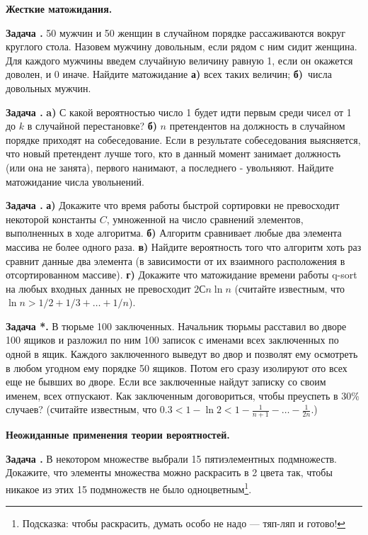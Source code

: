 \documentclass[11pt,a4paper]{article}
\newcounter{znum}
\newcommand{\z}[1]{\addtocounter{znum}{1} \textbf{Задача \arabic{znum}#1. }}
\renewcommand{\!}{\textcolor{red}{!}}
\begin{document}
\pagestyle{empty}

\newpage
\begin{center}
	\large
	\textbf{Жесткие матожидания.}
\end{center}

\z{} 50 мужчин и 50 женщин в случайном порядке рассаживаются вокруг круглого стола. Назовем мужчину довольным, если рядом с ним сидит женщина. Для каждого мужчины введем случайную величину равную 1, если он окажется доволен, и 0 иначе. Найдите матожидание \textbf{а)} всех таких величин; \textbf{б)}~числа довольных мужчин.

\z{} \textbf{a)} С какой вероятностью число 1 будет идти первым среди чисел от 1 до $k$ в случайной перестановке?
\textbf{б)} $n$ претендентов на должность в случайном порядке приходят на собеседование. Если в результате собеседования выясняется, что новый претендент лучше того, кто в данный момент занимает должность (или она не занята), первого нанимают, а последнего - увольняют. Найдите матожидание числа увольнений.

\z{} \textbf{а)} Докажите что время работы быстрой сортировки не превосходит некоторой константы $C$, умноженной на число сравнений элементов, выполненных в ходе алгоритма. \textbf{б)} Алгоритм сравнивает любые два элемента массива не более одного раза. \textbf{в)}  Найдите вероятность того что алгоритм хоть раз сравнит данные два элемента (в зависимости от их взаимного расположения в отсортированном массиве). \textbf{г)} Докажите что матожидание времени работы q-sort на любых входных данных не превосходит $2 С n \ln n$ (считайте известным, что $\ln n > 1/2 + 1/3+\ldots +1/n$).

\z{*} В тюрьме 100 заключенных. Начальник тюрьмы расставил во дворе 100 ящиков и разложил по ним 100 записок с именами всех заключенных по одной в ящик. Каждого заключенного выведут во двор и позволят ему осмотреть в любом угодном ему порядке 50 ящиков. Потом его сразу изолируют ото всех еще не бывших во дворе. Если все заключенные найдут записку со своим именем, всех отпускают. Как заключенным договориться, чтобы преуспеть в 30\% случаев? (считайте известным, что $0.3 < 1 - \ln 2 < 1 - \frac1{n+1} - \ldots - \frac1{2n}$.)


\begin{center}
	\large
	\textbf{Неожиданные применения теории вероятностей.}
\end{center}

\z{} В некотором множестве выбрали 15 пятиэлементных подмножеств. Докажите, что элементы множества можно раскрасить в 2 цвета так, чтобы никакое из этих 15 подмножеств не было одноцветным\footnote{Подсказка: чтобы раскрасить, думать особо не надо --- тяп-ляп и готово!}.
\end{document}
